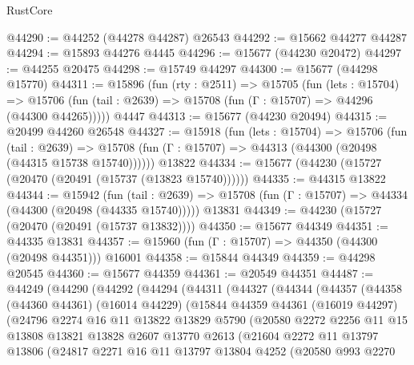 \begin{lexlean}{RustCore}
\begin{coremodule}
@44290 := @44252 (@44278 @44287) @26543
@44292 := @15662 @44277 @44287
@44294 := @15893 @44276 @4445
@44296 := @15677 (@44230 @20472)
@44297 := @44255 @20475
@44298 := @15749 @44297
@44300 := @15677 (@44298 @15770)
@44311 := @15896
    (fun (rty : @2511) =>
    @15705
      (fun (lets : @15704) =>
      @15706 (fun (tail : @2639) => @15708 (fun (Γ : @15707) => @44296 (@44300 @44265)))))
    @4447
@44313 := @15677 (@44230 @20494)
@44315 := @20499 @44260 @26548
@44327 := @15918
    (fun (lets : @15704) =>
    @15706
      (fun (tail : @2639) =>
      @15708 (fun (Γ : @15707) => @44313 (@44300 (@20498 (@44315 @15738 @15740))))))
    @13822
@44334 := @15677 (@44230 (@15727 (@20470 (@20491 (@15737 (@13823 @15740))))))
@44335 := @44315 @13822
@44344 := @15942
    (fun (tail : @2639) => @15708 (fun (Γ : @15707) => @44334 (@44300 (@20498 (@44335 @15740)))))
    @13831
@44349 := @44230 (@15727 (@20470 (@20491 (@15737 @13832))))
@44350 := @15677 @44349
@44351 := @44335 @13831
@44357 := @15960 (fun (Γ : @15707) => @44350 (@44300 (@20498 @44351))) @16001
@44358 := @15844 @44349
@44359 := @44298 @20545
@44360 := @15677 @44359
@44361 := @20549 @44351
@44487 := @44249
    (@44290
      (@44292
        (@44294
          (@44311
            (@44327
              (@44344
                (@44357
                  (@44358
                    (@44360 @44361)
                    (@16014 @44229)
                    (@15844
                      @44359
                      @44361
                      (@16019 @44297)
                      (@24796
                        @2274
                        @16
                        @11
                        @13822
                        @13829
                        @5790
                        (@20580
                          @2272
                          @2256
                          @11
                          @15
                          @13808
                          @13821
                          @13828
                          @2607
                          @13770
                          @2613
                          (@21604
                            @2272
                            @11
                            @13797
                            @13806
                            (@24817
                              @2271
                              @16
                              @11
                              @13797
                              @13804
                              @4252
                              (@20580
                                @993
                                @2270

\end{coremodule}
\end{lexlean}
